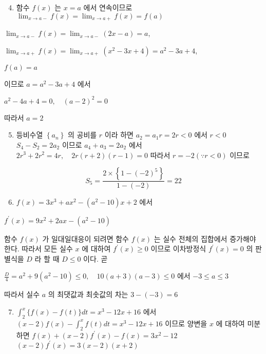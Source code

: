 \documentclass[10pt]{article}
\begin{document}
\begin{enumerate}
  \setcounter{enumi}{3}
  \item 함수 \(f(x)\) 는 \(x=a\) 에서 연속이므로 \(\lim _{x \rightarrow a-} f(x)=\lim _{x \rightarrow a+} f(x)=f(a)\)
\end{enumerate}

\(\lim _{x \rightarrow a-} f(x)=\lim _{x \rightarrow a-}(2 x-a)=a\),

\(\lim _{x \rightarrow a+} f(x)=\lim _{x \rightarrow a+}\left(x^{2}-3 x+4\right)=a^{2}-3 a+4\),

\(f(a)=a\)

이므로 \(a=a^{2}-3 a+4\) 에서

\(a^{2}-4 a+4=0, \quad(a-2)^{2}=0\)

따라서 \(a=2\)

\begin{enumerate}
  \setcounter{enumi}{4}
  \item 등비수열 \(\left\{a_{n}\right\}\) 의 공비를 \(r\) 이라 하면 \(a_{2}=a_{1} r=2 r<0\) 에서 \(r<0\) \(S_{4}-S_{2}=2 a_{2}\) 이므로 \(a_{4}+a_{3}=2 a_{2}\) 에서 \(2 r^{3}+2 r^{2}=4 r, \quad 2 r(r+2)(r-1)=0\) 따라서 \(r=-2(\because r<0)\) 이므로
\end{enumerate}

\[
S_{5}=\frac{2 \times\left\{1-(-2)^{5}\right\}}{1-(-2)}=22
\]

\begin{enumerate}
  \setcounter{enumi}{5}
  \item \(f(x)=3 x^{3}+a x^{2}-\left(a^{2}-10\right) x+2\) 에서
\end{enumerate}

\(f^{\prime}(x)=9 x^{2}+2 a x-\left(a^{2}-10\right)\)

함수 \(f(x)\) 가 일대일대응이 되려면 함수 \(f(x)\) 는 실수 전체의 집합에서 증가해야 한다. 따라서 모든 실수 \(x\) 에 대하여 \(f^{\prime}(x) \geq 0\) 이므로 이차방정식 \(f^{\prime}(x)=0\) 의 판별식을 \(D\) 라 할 때 \(D \leq 0\) 이다. 곧

\(\frac{D}{4}=a^{2}+9\left(a^{2}-10\right) \leq 0, \quad 10(a+3)(a-3) \leq 0\) 에서 \(-3 \leq a \leq 3\)

따라서 실수 \(a\) 의 최댓값과 최솟값의 차는 \(3-(-3)=6\)

\begin{enumerate}
  \setcounter{enumi}{6}
  \item \(\int_{2}^{x}\{f(x)-f(t)\} d t=x^{3}-12 x+16\) 에서 \((x-2) f(x)-\int_{2}^{x} f(t) d t=x^{3}-12 x+16\) 이므로 양변을 \(x\) 에 대하여 미분하면 \(f(x)+(x-2) f^{\prime}(x)-f(x)=3 x^{2}-12\) \((x-2) f^{\prime}(x)=3(x-2)(x+2)\)
\end{enumerate}
\end{document}

